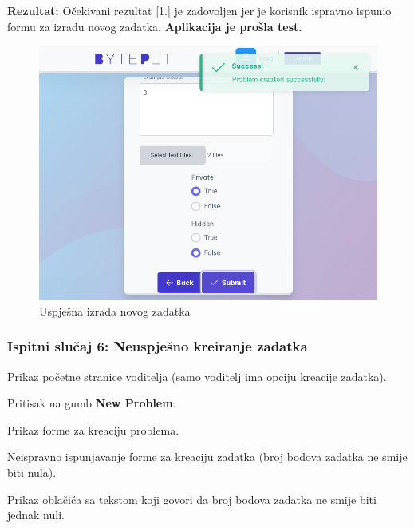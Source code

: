 			\noindent \textbf{Rezultat:} Očekivani rezultat [1.] je zadovoljen jer je korisnik ispravno ispunio formu za izradu novog zadatka. \textbf{Aplikacija je prošla test.}
			
			\begin{figure}[H]
				\includegraphics[scale=0.50]{slike/create_problem_test.PNG}
				\centering
				\caption{Uspješna izrada novog zadatka}
				\label{fig:sucess_new_problem}
			\end{figure}
			
			\eject
			
			\subsubsection{Ispitni slučaj 6: Neuspješno kreiranje zadatka}
			
			
			\begin{packed_enum}
				
				\item  Prikaz početne stranice voditelja (samo voditelj ima opciju kreacije zadatka).
				\item  Pritisak na gumb \textbf{New Problem}.
				\item  Prikaz forme za kreaciju problema.
				\item  Neispravno ispunjavanje forme za kreaciju zadatka (broj bodova zadatka ne smije biti nula).
				
			\end{packed_enum}
			
			\begin{packed_enum}
				
				\item  Prikaz oblačića sa tekstom koji govori da broj bodova zadatka ne smije biti jednak nuli.
				
			\end{packed_enum}
			
